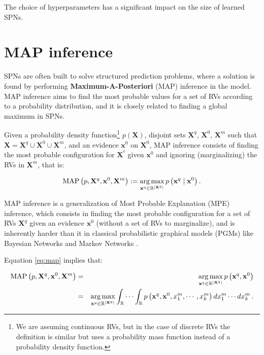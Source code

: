 The choice of hyperparameters has a significant impact on the size of learned SPNs.

\section{MAP inference}
\label{sec:spn:map}

SPNs are often built to solve structured prediction problems, where a solution is found by performing \textbf{Maximum-A-Posteriori} (MAP) inference in the model. MAP inference aims to find the most probable values for a set of RVs according to a probability distribution, and it is closely related to finding a global maximum in SPNs.

\begin{definition}
  Given a probability density function\footnote{We are assuming continuous RVs, but in the case of discrete RVs the definition is similar but uses a probability mass function instead of a probability density function.} $p(\mathbf{X})$, disjoint sets $\mathbf{X}^q$, $\mathbf{X}^0$, $\mathbf{X}^m$ such that $\mathbf{X} = \mathbf{X}^q \cup \mathbf{X}^0 \cup \mathbf{X}^m$, and an evidence $\mathbf{x}^0$ on $\mathbf{X}^0$, MAP inference consists of finding the most probable configuration for $\mathbf{X}^^q$ given $\mathbf{x}^0$ and ignoring (marginalizing) the RVs in $\mathbf{X}^m$, that is:

  \begin{equation}
    \label{eq:map}
    \operatorname*{MAP}\left(p, \mathbf{X}^q, \mathbf{x}^0, \mathbf{X}^m\right) := \operatorname*{arg\,max}_{\mathbf{x}^q \in \mathbb{R}^{|\mathbf{X}^q|}}{p\left(\mathbf{x}^q \mid \mathbf{x}^0\right)} \, .
  \end{equation}
\end{definition}

MAP inference is a generalization of Most Probable Explanation (MPE) inference, which consists in finding the most probable configuration for a set of RVs $\mathbf{X}^q$ given an evidence $\mathbf{x}^0$ (without a set of RVs to marginalize), and is inherently harder than it in classical probabilistic graphical models (PGMs) like Bayesian Networks and Markov Networks \citep{Park2004}.

Equation \ref{eq:map} implies that:

\begin{eqnarray}
  \operatorname*{MAP}\left(p, \mathbf{X}^q, \mathbf{x}^0, \mathbf{X}^m\right) & = & \operatorname*{arg\,max}_{\mathbf{x}^q \in \mathbb{R}^{|\mathbf{X}^q|}}{p\left(\mathbf{x}^q, \mathbf{x}^0\right)} \\
  & = & \operatorname*{arg\,max}_{\mathbf{x}^q \in \mathbb{R}^{|\mathbf{X}^q|}}{\int_\mathbb{R} \cdots \int_\mathbb{R} p\left(\mathbf{x}^q, \mathbf{x}^0, x^m_1, \cdots, x^m_k\right) dx^m_1 \cdots dx^m_k} \, .
\end{eqnarray}

